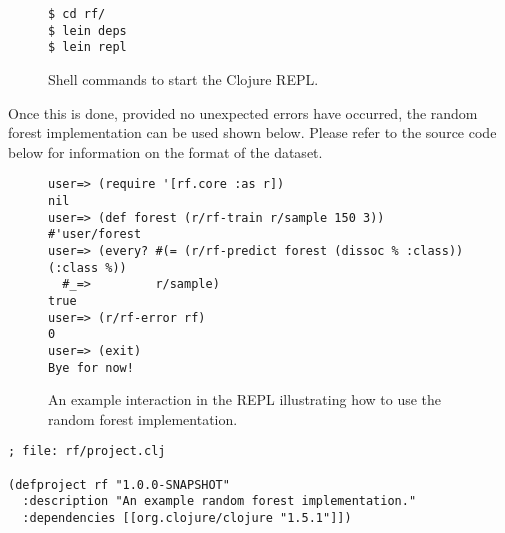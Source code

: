 \documentclass[a4paper,man,12pt,apacite,floatsintext]{apa6} %
\begin{document}
\begin{figure}[H]
\caption{Shell commands to start the Clojure REPL.}
\begin{verbatim}
$ cd rf/
$ lein deps
$ lein repl
\end{verbatim}
\end{figure}

Once this is done, provided no unexpected errors have occurred,
the random forest implementation can be used shown below.
Please refer to the source code below for information on the
format of the dataset.

\begin{figure}[H]
\caption{An example interaction in the REPL illustrating how to use the random forest implementation.}
\begin{verbatim}
user=> (require '[rf.core :as r])
nil
user=> (def forest (r/rf-train r/sample 150 3))
#'user/forest
user=> (every? #(= (r/rf-predict forest (dissoc % :class)) (:class %))
  #_=>         r/sample)
true
user=> (r/rf-error rf)
0
user=> (exit)
Bye for now!
\end{verbatim}
\end{figure}

\newpage
\begin{verbatim}
; file: rf/project.clj

(defproject rf "1.0.0-SNAPSHOT"
  :description "An example random forest implementation."
  :dependencies [[org.clojure/clojure "1.5.1"]])
\end{verbatim}
\end{document}
